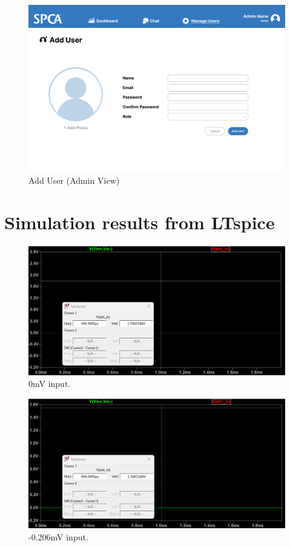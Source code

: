 \begin{figure}[h]
\centering
\includegraphics[width=\textwidth]{proposal/parts/admin-add-user.png}
\caption{Add User (Admin View)}
\end{figure}


\chapter{Simulation results from LTspice}

\begin{figure}[h]
\centering
\includegraphics[width=\textwidth]{proposal/parts/0mV.png}
\caption{0mV input.}
\end{figure}

\begin{figure}[h]
\centering
\includegraphics[width=\textwidth]{proposal/parts/-0.206mV.png}
\caption{-0.206mV input.}
\end{figure}


